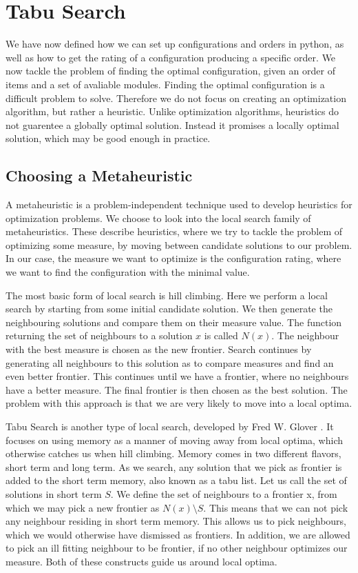\section{Tabu Search}
We have now defined how we can set up configurations and orders in python, as well as how to get the rating of a configuration producing a specific order. We now tackle the problem of finding the optimal configuration, given an order of items and a set of avaliable modules. Finding the optimal configuration is a difficult problem to solve. Therefore we do not focus on creating an optimization algorithm, but rather a heuristic. Unlike optimization algorithms, heuristics do not guarentee a globally optimal solution. Instead it promises a locally optimal solution, which may be good enough in practice.

\subsection{Choosing a Metaheuristic}
A metaheuristic is a problem-independent technique used to develop heuristics for optimization problems. We choose to look into the local search family of metaheuristics. These describe heuristics, where we try to tackle the problem of optimizing some measure, by moving between candidate solutions to our problem. In our case, the measure we want to optimize is the configuration rating, where we want to find the configuration with the minimal value.

The most basic form of local search is hill climbing. Here we perform a local search by starting from some initial candidate solution. We then generate the neighbouring solutions and compare them on their measure value. The function returning the set of neighbours to a solution $x$ is called $N(x)$. The neighbour with the best measure is chosen as the new frontier. Search continues by generating all neighbours to this solution as to compare measures and find an even better frontier. This continues until we have a frontier, where no neighbours have a better measure. The final frontier is then chosen as the best solution. The problem with this approach is that we are very likely to move into a local optima. 

Tabu Search is another type of local search, developed by Fred W. Glover \cite{glover2006}. It focuses on using memory as a manner of moving away from local optima, which otherwise catches us when hill climbing. Memory comes in two different flavors, short term and long term. As we search, any solution that we pick as frontier is added to the short term memory, also known as a tabu list. Let us call the set of solutions in short term $S$. We define the set of neighbours to a frontier x, from which we may pick a new frontier as $N(x) \setminus S$. This means that we can not pick any neighbour residing in short term memory. This allows us to pick neighbours, which we would otherwise have dismissed as frontiers. In addition, we are allowed to pick an ill fitting neighbour to be frontier, if no other neighbour optimizes our measure. Both of these constructs guide us around local optima.

